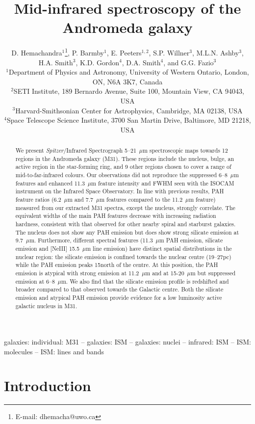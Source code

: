 \documentclass[useAMS,usenatbib,a4paper]{mn2e}
\title[Mid-infrared spectroscopy of M31]{Mid-infrared spectroscopy of the Andromeda galaxy}
\author[D. Hemachandra et al.]
{D. Hemachandra$^{1}$\thanks{E-mail: dhemacha@uwo.ca},
P. Barmby$^{1}$, 
E. Peeters$^{1,2}$, 
S.P. Willner$^{3}$, 
M.L.N. Ashby$^{3}$,
H.A. Smith$^{3}$, 
\newauthor 
K.D. Gordon$^{4}$,
D.A. Smith$^{4}$,
and
G.G. Fazio$^{3}$\\
$^{1}$Department of Physics and Astronomy, University of Western Ontario, London, ON, N6A 3K7, Canada\\
$^{2}$SETI Institute, 189 Bernardo Avenue, Suite 100, Mountain View, CA 94043, USA\\
$^{3}$Harvard-Smithsonian Center for Astrophysics, Cambridge, MA 02138, USA\\
$^{4}$Space Telescope Science Institute, 3700 San Martin Drive, Baltimore, MD 21218, USA
}
\begin{document}
\date{}

\maketitle

\label{firstpage}

\begin{abstract}
We present {\sl Spitzer}/Infrared Spectrograph 5--21~$\mu$m spectroscopic maps towards 12 regions in the Andromeda galaxy (M31). 
These regions include the nucleus, bulge, an active region in the star-forming ring, and 9 other regions chosen to cover a range of mid-to-far-infrared colours. 
Our observations did not reproduce the suppressed 6--8~$\mu$m features and enhanced 11.3~$\mu$m feature intensity and FWHM seen with the ISOCAM instrument on the Infrared Space Observatory.
In line with previous results, PAH feature ratios (6.2~$\mu$m and 7.7~$\mu$m features compared to the 11.2~$\mu$m feature) measured from our extracted M31 spectra, except the nucleus, strongly correlate. The equivalent widths of the main PAH 
features decrease with increasing radiation hardness, consistent with that observed for other nearby spiral and starburst galaxies. 
The nucleus does not show any PAH emission but does show strong silicate emission at 9.7~$\mu$m. Furthermore, different spectral features (11.3~$\mu$m PAH emission, silicate emission and [NeIII] 15.5~$\mu$m line emission) have distinct spatial distributions in the nuclear region: the silicate emission is confined towards the nuclear centre (19--27pc) while the PAH emission peaks 15\arcsec north of the centre. At this position, the PAH emission is atypical with strong emission at 11.2~$\mu$m and at 15-20~$\mu$m but suppressed emission at 6--8~$\mu$m. We also find that the silicate emission profile is redshifted and broader compared to that observed towards the Galactic centre. 
Both the silicate emission and atypical PAH emission provide evidence for a low luminosity active galactic nucleus in M31.
\end{abstract}

\begin{keywords}
galaxies: individual: M31 --
galaxies: ISM --
galaxies: nuclei --
infrared: ISM --
ISM:  molecules -- 
ISM: lines and bands
\end{keywords}



\section{Introduction}
\end{document}
